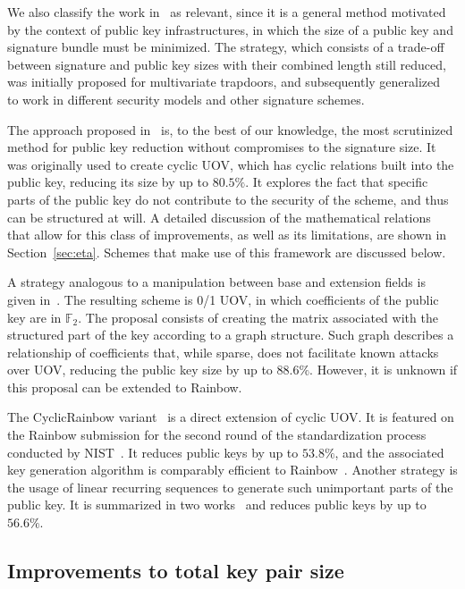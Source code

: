 \documentclass[12pt, a4paper, oneside]{memoir}
\theoremstyle{definition}
\begin{document}
We also classify the work in~\cite{Szepieniec:201706} as relevant, since it is a general method motivated by the context of public key infrastructures, in which the size of a public key and signature bundle must be minimized. The strategy, which consists of a trade-off between signature and public key sizes with their combined length still reduced, was initially proposed for multivariate trapdoors, and subsequently generalized~\cite{Beullens:201808} to work in different security models and other signature schemes.

The approach proposed in~\cite{Petzoldt:201006} is, to the best of our knowledge, the most scrutinized method for public key reduction without compromises to the signature size. It was originally used to create cyclic UOV, which has cyclic relations built into the public key, reducing its size by up to $80.5\%$. It explores the fact that specific parts of the public key do not contribute to the security of the scheme, and thus can be structured at will. A detailed discussion of the mathematical relations that allow for this class of improvements, as well as its limitations, are shown in Section~\ref{sec:eta}. Schemes that make use of this framework are discussed below. 

A strategy analogous to a manipulation between base and extension fields is given in~\cite{Petzoldt:201109}. The resulting scheme is 0/1 UOV, in which coefficients of the public key are in $\mathbb{F}_{2}$. The proposal consists of creating the matrix associated with the structured part of the key according to a graph structure. Such graph describes a relationship of coefficients that, while sparse, does not facilitate known attacks over UOV, reducing the public key size by up to $88.6\%$. However, it is unknown if this proposal can be extended to Rainbow.

The CyclicRainbow variant~\cite{Petzoldt:201012} is a direct extension of cyclic UOV. It is featured on the Rainbow submission for the second round of the standardization process conducted by NIST~\cite{Ding:201901}. It reduces public keys by up to $53.8\%$, and the associated key generation algorithm is comparably efficient to Rainbow~\cite{Petzoldt:202004}. Another strategy is the usage of linear recurring sequences to generate such unimportant parts of the public key. It is summarized in two works~\cite{Petzoldt:201103,Petzoldt:201211} and reduces public keys by up to $56.6\%$.

\subsection{Improvements to total key pair size}\label{subsec:both}
\end{document}
